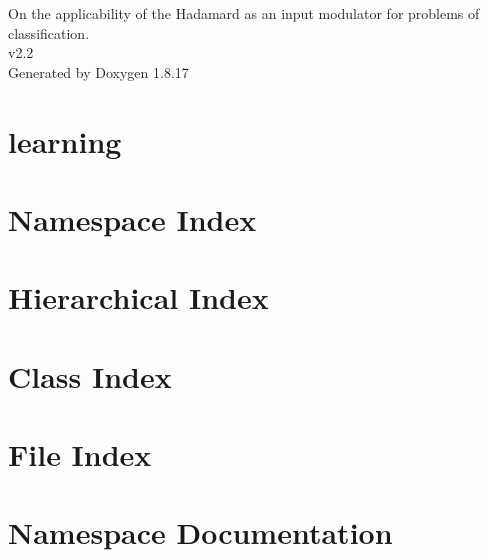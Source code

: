 \let\mypdfximage\pdfximage\def\pdfximage{\immediate\mypdfximage}\documentclass[twoside]{book}
\newcommand{\+}{\discretionary{\mbox{\scriptsize$\hookleftarrow$}}{}{}}
\newcommand{\clearemptydoublepage}{%
  \newpage{\pagestyle{empty}\cleardoublepage}%
}
\begin{document}
\hypersetup{pageanchor=false,
             bookmarksnumbered=true,
             pdfencoding=unicode
            }
\begin{titlepage}
\vspace*{7cm}
\begin{center}%
{\Large On the applicability of the Hadamard as an input modulator for problems of classification. \\[1ex]\large v2.\+2 }\\
\vspace*{1cm}
{\large Generated by Doxygen 1.8.17}\\
\end{center}
\end{titlepage}
\clearemptydoublepage
{}
\tableofcontents
\clearemptydoublepage
{}
\hypersetup{pageanchor=true}

\chapter{learning}
\label{md_lg_learning}

\chapter{Namespace Index}

\chapter{Hierarchical Index}

\chapter{Class Index}

\chapter{File Index}

\chapter{Namespace Documentation}








\end{document}
